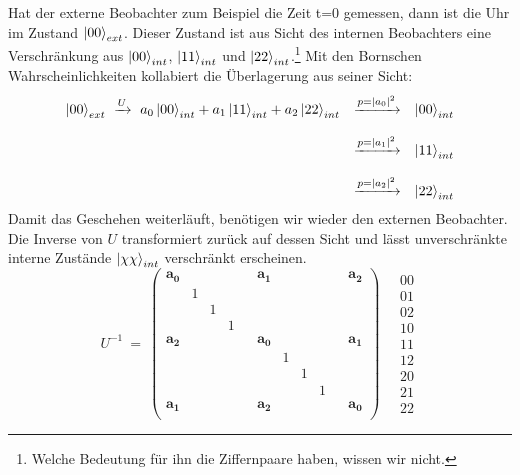 \documentclass[12pt]{article}
\begin{document}
Hat der externe Beobachter zum Beispiel die Zeit t=0 gemessen, dann ist die Uhr im Zustand $\ket{00}_{ext}$. Dieser Zustand ist aus Sicht des internen Beobachters eine Verschränkung aus $\ket{00}_{int}$, $\ket{11}_{int}$ und $\ket{22}_{int}$.\footnote{Welche Bedeutung für ihn die Ziffernpaare haben, wissen wir nicht.} Mit den Bornschen Wahrscheinlichkeiten kollabiert die Überlagerung aus seiner Sicht:
\begin{equation*}
\begin{matrix}
\ket{00}_{ext} \ \xrightarrow{U} \ a_0\ket{00}_{int} + a_1\ket{11}_{int} + a_2\ket{22}_{int} 
& \xrightarrow{p = |a_0|^2} & \ket{00}_{int} \\ \\
& \xrightarrow{p = |a_1|^2} & \ket{11}_{int} \\ \\
& \xrightarrow{p = |a_2|^2} & \ket{22}_{int}
\end{matrix}
\end{equation*}
Damit das Geschehen weiterläuft, benötigen wir wieder den externen Beobachter. Die Inverse von $U$ transformiert zurück auf dessen Sicht und lässt unverschränkte interne Zustände $\ket{\chi\chi}_{int}$ verschränkt erscheinen.
\begin{equation}
U^{-1}\ =\ 
\begin{pmatrix}
\label{eq:not_U}
\pmb{a_0} &&&&& \pmb{a_1} &&&&& \pmb{a_2} \\
  & 1 &   &   &   &   &   &   &   &   &   \\
  &   & 1 &   &   &   &   &   &   &   &   \\
  &   &   & 1 &   &   &   &   &   &   &   \\
\pmb{a_2} &&&&& \pmb{a_0} &&&&& \pmb{a_1} \\
  &   &   &   &   &   & 1 &   &   &   &   \\
  &   &   &   &   &   &   & 1 &   &   &   \\
  &   &   &   &   &   &   &   & 1 &   &   \\
\pmb{a_1} &&&&& \pmb{a_2} &&&&& \pmb{a_0} \\
\end{pmatrix}
\quad
\begin{matrix}
00 \\ 01 \\ 02 \\ 10 \\ 11 \\ 12 \\ 20 \\ 21 \\ 22 
\end{matrix}
\end{equation}
\end{document}
